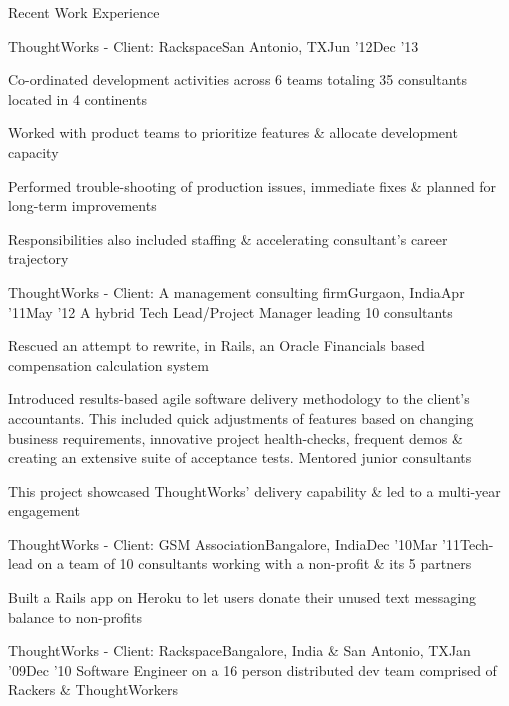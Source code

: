 \documentclass{resume} %
\begin{document}
\begin{rSection}{Recent Work Experience}
\begin{rSubsection}{ThoughtWorks - Client: Rackspace}{San Antonio, TX}{Jun '12}{Dec '13}
\item Co-ordinated development activities across 6 teams
  totaling 35 consultants located in 4 continents
\item Worked with product teams to prioritize features \& allocate development capacity
\item Performed trouble-shooting of production issues, immediate fixes \& planned for long-term improvements
\item Responsibilities also included staffing \& accelerating consultant's career trajectory
\end{rSubsection}


\begin{rSubsection}{ThoughtWorks - Client: A management consulting
    firm}{Gurgaon, India}{Apr '11}{May '12}
  {A hybrid Tech Lead/Project Manager leading 10 consultants}

\item Rescued an attempt to rewrite, in Rails, an Oracle Financials based compensation calculation system
\item Introduced results-based agile software delivery
  methodology to the client's accountants. This included quick
  adjustments of features based on changing business requirements, innovative
  project health-checks, frequent demos \& creating an extensive suite
  of acceptance tests. Mentored junior consultants
\item This project showcased ThoughtWorks' delivery capability \& led to a multi-year engagement

\end{rSubsection}


\begin{rSubsection}{ThoughtWorks - Client: GSM Association}{Bangalore, India}{Dec '10}{Mar '11}{Tech-lead on a team of 10 consultants working with a non-profit
  \& its 5 partners}
\item Built a Rails app on Heroku to let users donate their unused text messaging balance to non-profits

\end{rSubsection}



\begin{rSubsection}{ThoughtWorks - Client: Rackspace}{Bangalore, India \& San Antonio,
  TX}{Jan '09}{Dec '10}
{Software Engineer on a 16 person distributed dev team comprised of Rackers \& ThoughtWorkers}


\end{rSubsection}
\end{rSection}
\end{document}
